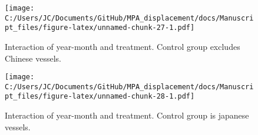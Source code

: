\documentclass[11pt,]{article}
\begin{document}
\begin{figure}
\centering
\texttt{[image: C:/Users/JC/Documents/GitHub/MPA\_displacement/docs/Manuscript\_files/figure-latex/unnamed-chunk-27-1.pdf]}
\caption{\label{fig:unnamed-chunk-27}\label{fig:ym3}Interaction of
year-month and treatment. Control group excludes Chinese vessels.}
\end{figure}

\begin{figure}
\centering
\texttt{[image: C:/Users/JC/Documents/GitHub/MPA\_displacement/docs/Manuscript\_files/figure-latex/unnamed-chunk-28-1.pdf]}
\caption{\label{fig:unnamed-chunk-28}\label{fig:ym4}Interaction of
year-month and treatment. Control group is japanese vessels.}
\end{figure}

\clearpage


\end{document}
